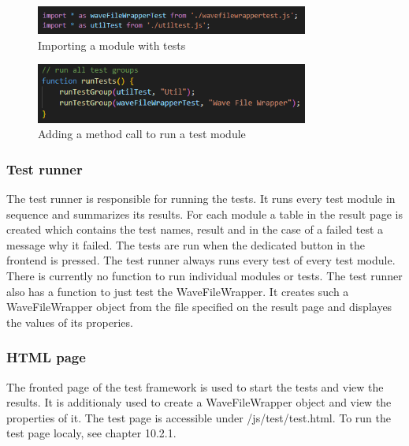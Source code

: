 \begin{figure}[H]
    \centering
    \includegraphics[width=0.8\textwidth]{../assets/import_test_module.png}
    \caption{Importing a module with tests}
\end{figure}

\begin{figure}[H]
    \centering
    \includegraphics[width=0.8\textwidth]{../assets/add_call_to_runTestGroup.png}
    \caption{Adding a method call to run a test module}
\end{figure}

\subsubsection{Test runner}
The test runner is responsible for running the tests. It runs every test module in sequence and summarizes its results. For each module a table in the result page is created which contains the test names, result and in the case of a failed test a message why it failed. The tests are run when the dedicated button in the frontend is pressed. The test runner always runs every test of every test module. There is currently no function to run individual modules or tests.
The test runner also has a function to just test the WaveFileWrapper. It creates such a WaveFileWrapper object from the file specified on the result page and displayes the values of its properies.

\subsubsection{HTML page}
The fronted page of the test framework is used to start the tests and view the results. It is additionaly used to create a WaveFileWrapper object and view the properties of it. The test page is accessible under /js/test/test.html. To run the test page localy, see chapter 10.2.1. 

